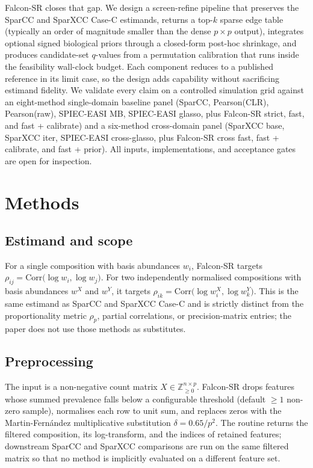 \documentclass[unnumsec,webpdf,contemporary,large]{oup-authoring-template}
\theoremstyle{thmstyleone}
\theoremstyle{thmstyletwo}
\theoremstyle{thmstylethree}
\begin{document}
Falcon-SR closes that gap. We design a screen-refine pipeline that
preserves the SparCC and SparXCC Case-C estimands, returns a top-$k$
sparse edge table (typically an order of magnitude smaller than the
dense $p \times p$ output), integrates optional signed biological
priors through a closed-form post-hoc shrinkage, and produces
candidate-set $q$-values from a permutation calibration that runs
inside the feasibility wall-clock budget. Each component reduces to a
published reference in its limit case, so the design adds capability
without sacrificing estimand fidelity. We validate every claim on a
controlled simulation grid against an eight-method single-domain
baseline panel (SparCC, Pearson(CLR), Pearson(raw), SPIEC-EASI MB,
SPIEC-EASI glasso, plus Falcon-SR strict, fast, and fast + calibrate)
and a six-method cross-domain panel (SparXCC base, SparXCC iter,
SPIEC-EASI cross-glasso, plus Falcon-SR cross fast, fast + calibrate,
and fast + prior). All inputs, implementations, and acceptance gates
are open for inspection.

\section{Methods}\label{sec:methods}

\subsection{Estimand and scope}\label{sec:estimand}

For a single composition with basis abundances $w_i$, Falcon-SR targets
$\rho_{ij} = \mathrm{Corr}\bigl(\log w_i, \log w_j\bigr)$. For two
independently normalised compositions with basis abundances
$w^X$ and $w^Y$, it targets
$\rho_{ik} = \mathrm{Corr}\bigl(\log w_i^X, \log w_k^Y\bigr)$. This is
the same estimand as SparCC and SparXCC Case-C and is strictly
distinct from the proportionality metric $\rho_p$, partial
correlations, or precision-matrix entries; the paper does not use those
methods as substitutes.

\subsection{Preprocessing}\label{sec:preproc}

The input is a non-negative count matrix
$X \in \mathbb{Z}_{\ge 0}^{n \times p}$. Falcon-SR drops features whose
summed prevalence falls below a configurable threshold (default
$\geq 1$ non-zero sample), normalises each row to unit sum, and
replaces zeros with the Martin-Fern\'andez multiplicative substitution
$\delta = 0.65 / p^2$. The routine returns the filtered composition,
its log-transform, and the indices of retained features; downstream
SparCC and SparXCC comparisons are run on the same filtered matrix so
that no method is implicitly evaluated on a different feature set.
\end{document}
